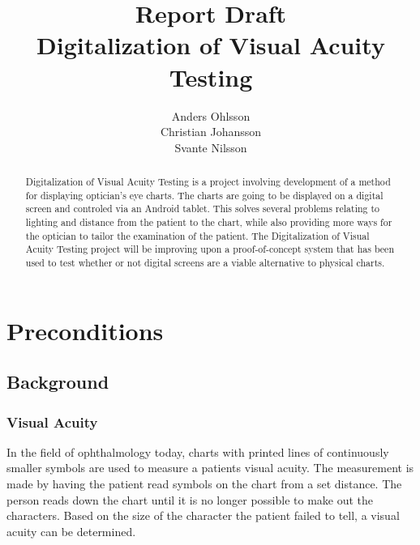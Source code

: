 \documentclass[12pt,a4paper,notitlepage]{report}
\begin{document}
\title{Report Draft\\Digitalization of Visual Acuity Testing}
\author{Anders Ohlsson\\Christian Johansson\\Svante Nilsson}
\maketitle

\begin{abstract}
Digitalization of Visual Acuity Testing is a project involving development of a method for displaying optician's eye charts. The charts are going to be displayed on a digital screen and controled via an Android tablet. This solves several problems relating to lighting and distance from the patient to the chart, while also providing more ways for the optician to tailor the examination of the patient. The Digitalization of Visual Acuity Testing project will be improving upon a proof-of-concept system that has been used to test whether or not digital screens are a viable alternative to physical charts.
\end{abstract}
\thispagestyle{empty}
\clearpage

\tableofcontents
\thispagestyle{empty}
\clearpage

\setcounter{page}{1}
\chapter{Preconditions}
\section{Background}
\subsection{Visual Acuity}
In the field of ophthalmology today, charts with printed lines of continuously smaller symbols are used to measure a patients visual acuity. The measurement is made by having the patient read symbols on the chart from a set distance. The person reads down the chart until it is no longer possible to make out the characters. Based on the size of the character the patient failed to tell, a visual acuity can be determined. 
\end{document}
